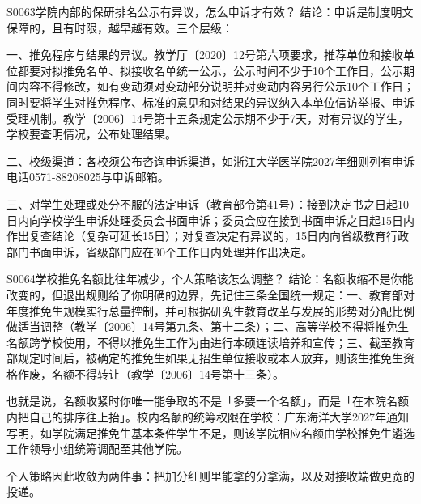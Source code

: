 \begin{qa}{S0063}{学院内部的保研排名公示有异议，怎么申诉才有效？}
结论：申诉是制度明文保障的，且有时限，越早越有效。三个层级：

一、推免程序与结果的异议。教学厅〔2020〕12号第六项要求，推荐单位和接收单位都要对拟推免名单、拟接收名单统一公示，公示时间不少于10个工作日，公示期间内容不得修改，如有变动须对变动部分说明并对变动内容另行公示10个工作日；同时要将学生对推免程序、标准的意见和对结果的异议纳入本单位信访举报、申诉受理机制。教学〔2006〕14号第十五条规定公示期不少于7天，对有异议的学生，学校要查明情况，公布处理结果。

二、校级渠道：各校须公布咨询申诉渠道，如浙江大学医学院2027年细则列有申诉电话0571-88208025与申诉邮箱。

三、对学生处理或处分不服的法定申诉（教育部令第41号）：接到决定书之日起10日内向学校学生申诉处理委员会书面申诉；委员会应在接到书面申诉之日起15日内作出复查结论（复杂可延长15日）；对复查决定有异议的，15日内向省级教育行政部门书面申诉，省级部门应在30个工作日内处理并作出决定。
\end{qa}

\begin{qa}{S0064}{学校推免名额比往年减少，个人策略该怎么调整？}
结论：名额收缩不是你能改变的，但退出规则给了你明确的边界，先记住三条全国统一规定：一、教育部对年度推免生规模实行总量控制，并可根据研究生教育改革与发展的形势对分配比例做适当调整（教学〔2006〕14号第九条、第十二条）；二、高等学校不得将推免生名额跨学校使用，不得以推免生工作为由进行本硕连读培养和宣传；三、截至教育部规定时间后，被确定的推免生如果无招生单位接收或本人放弃，则该生推免生资格作废，名额不得转让（教学〔2006〕14号第十三条）。

也就是说，名额收紧时你唯一能争取的不是「多要一个名额」，而是「在本院名额内把自己的排序往上抬」。校内名额的统筹权限在学校：广东海洋大学2027年通知写明，如学院满足推免生基本条件学生不足，则该学院相应名额由学校推免生遴选工作领导小组统筹调配至其他学院。

个人策略因此收敛为两件事：把加分细则里能拿的分拿满，以及对接收端做更宽的投递。
\end{qa}

